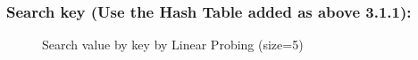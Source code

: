 \subsubsection{Search key (Use the Hash Table added as above 3.1.1):}
\begin{figure}[H]
	\centering
	\qquad
	\caption{Search value by key by Linear Probing (size=5)}%
\end{figure}

